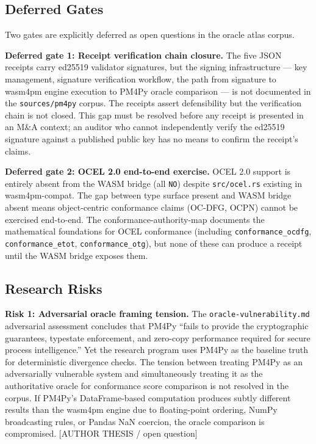 \subsection{Deferred Gates}
\label{sec:sources-pm4py-open-deferred}

Two gates are explicitly deferred as open questions in the oracle atlas corpus.

\textbf{Deferred gate 1: Receipt verification chain closure.} The five JSON receipts
carry ed25519 validator signatures, but the signing infrastructure --- key management,
signature verification workflow, the path from signature to wasm4pm engine execution to
PM4Py oracle comparison --- is not documented in the \texttt{sources/pm4py} corpus. The
receipts assert defensibility but the verification chain is not closed. This gap must be
resolved before any receipt is presented in an M\&A context; an auditor who cannot
independently verify the ed25519 signature against a published public key has no means
to confirm the receipt's claims.

\textbf{Deferred gate 2: OCEL 2.0 end-to-end exercise.} OCEL 2.0 support is entirely
absent from the WASM bridge (all \texttt{NO}) despite \texttt{src/ocel.rs} existing in
wasm4pm-compat. The gap between type surface present and WASM bridge absent means
object-centric conformance claims (OC-DFG, OCPN) cannot be exercised end-to-end.
The conformance-authority-map documents the mathematical foundations for OCEL conformance
(including \texttt{conformance\_ocdfg}, \texttt{conformance\_etot},
\texttt{conformance\_otg}), but none of these can produce a receipt until the WASM bridge
exposes them.

\subsection{Research Risks}
\label{sec:sources-pm4py-open-risks}

\textbf{Risk 1: Adversarial oracle framing tension.} The \texttt{oracle-vulnerability.md}
adversarial assessment concludes that PM4Py ``fails to provide the cryptographic
guarantees, typestate enforcement, and zero-copy performance required for secure process
intelligence.'' Yet the research program uses PM4Py as the baseline truth for
deterministic divergence checks. The tension between treating PM4Py as an adversarially
vulnerable system and simultaneously treating it as the authoritative oracle for
conformance score comparison is not resolved in the corpus. If PM4Py's DataFrame-based
computation produces subtly different results than the wasm4pm engine due to floating-point
ordering, NumPy broadcasting rules, or Pandas NaN coercion, the oracle comparison is
compromised. [AUTHOR THESIS / open question]

